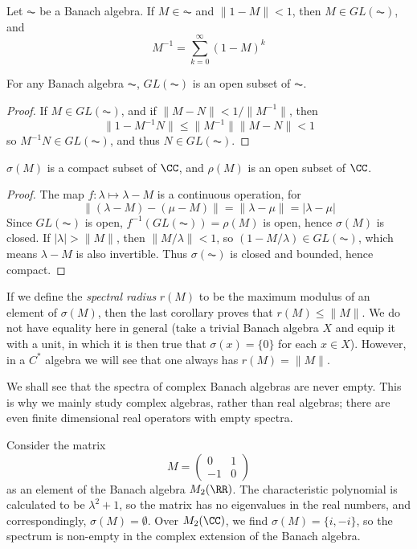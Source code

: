 \begin{corollary}
    Let $\AC$ be a Banach algebra. If $M \in \AC$ and $\| 1 - M \| < 1$, then $M \in GL(\AC)$, and
    \[ M^{-1} = \sum_{k = 0}^\infty (1 - M)^k \]
\end{corollary}

\begin{corollary}
    For any Banach algebra $\AC$, $GL(\AC)$ is an open subset of $\AC$.
\end{corollary}
\begin{proof}
    If $M \in GL(\AC)$, and if $\| M - N \| < 1/\| M^{-1} \|$, then
    \[ \| 1 - M^{-1}N \| \leq \| M^{-1} \| \| M - N \|  < 1 \]
    so $M^{-1}N \in GL(\AC)$, and thus $N \in GL(\AC)$.
\end{proof}

\begin{corollary}
    $\sigma(M)$ is a compact subset of $\CC$, and $\rho(M)$ is an open subset of $\CC$.
\end{corollary}
\begin{proof}
    The map $f: \lambda \mapsto \lambda - M$ is a continuous operation, for
    \[ \| (\lambda - M) - (\mu - M) \| = \| \lambda - \mu \| = | \lambda - \mu | \]
    Since $GL(\AC)$ is open, $f^{-1}(GL(\AC)) = \rho(M)$ is open, hence $\sigma(M)$ is closed. If $|\lambda| > \|M\|$, then $\| M/\lambda \| < 1$, so $(1 - M/\lambda) \in GL(\AC)$, which means $\lambda - M$ is also invertible. Thus $\sigma(\AC)$ is closed and bounded, hence compact.
\end{proof}

If we define the \emph{spectral radius} $r(M)$ to be the maximum modulus of an element of $\sigma(M)$, then the last corollary proves that $r(M) \leq \| M \|$. We do not have equality here in general (take a trivial Banach algebra $X$ and equip it with a unit, in which it is then true that $\sigma(x) = \{ 0 \}$ for each $x \in X$). However, in a $C^*$ algebra we will see that one always has $r(M) = \| M \|$.

We shall see that the spectra of complex Banach algebras are never empty. This is why we mainly study complex algebras, rather than real algebras; there are even finite dimensional real operators with empty spectra.

\begin{example}
    Consider the matrix
    \[ M = \begin{pmatrix} 0 & 1 \\ -1 & 0 \end{pmatrix} \]
    as an element of the Banach algebra $M_2(\RR)$. The characteristic polynomial is calculated to be $\lambda^2 + 1$, so the matrix has no eigenvalues in the real numbers, and correspondingly, $\sigma(M) = \emptyset$. Over $M_2(\CC)$, we find $\sigma(M) = \{ i, -i \}$, so the spectrum is non-empty in the complex extension of the Banach algebra.
\end{example}

